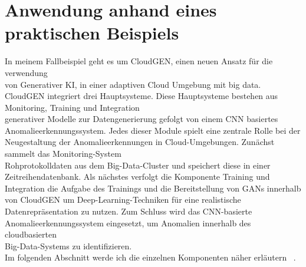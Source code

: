 \chapter{Anwendung anhand eines praktischen Beispiels}
\label{ch:prakBsp}
In meinem Fallbeispiel geht es um CloudGEN, einen neuen Ansatz für die verwendung \\ von Generativer KI, in einer adaptiven Cloud Umgebung mit big data. CloudGEN integriert drei Hauptsysteme. Diese Hauptsysteme bestehen aus Monitoring, Training und Integration \\ generativer Modelle zur Datengenerierung gefolgt von einem CNN basiertes \\ Anomalieerkennungssystem. Jedes dieser Module spielt eine zentrale Rolle bei der Neugestaltung der Anomalieerkennungen in Cloud-Umgebungen. Zunächst sammelt das Monitoring-System \\ Rohprotokolldaten aus dem Big-Data-Cluster und speichert diese in einer Zeitreihendatenbank. Als nächstes verfolgt die Komponente Training und Integration die Aufgabe des Trainings und die Bereitstellung von GANs innerhalb von CloudGEN um Deep-Learning-Techniken für eine realistische Datenrepräsentation zu nutzen. Zum Schluss wird das CNN-basierte \\ Anomalieerkennungssystem eingesetzt, um Anomalien innerhalb des cloudbasierten \\ Big-Data-Systems zu identifizieren.\\ Im folgenden Abschnitt werde ich die einzelnen Komponenten näher erläutern ~\cite{Fallbeispiel}.

